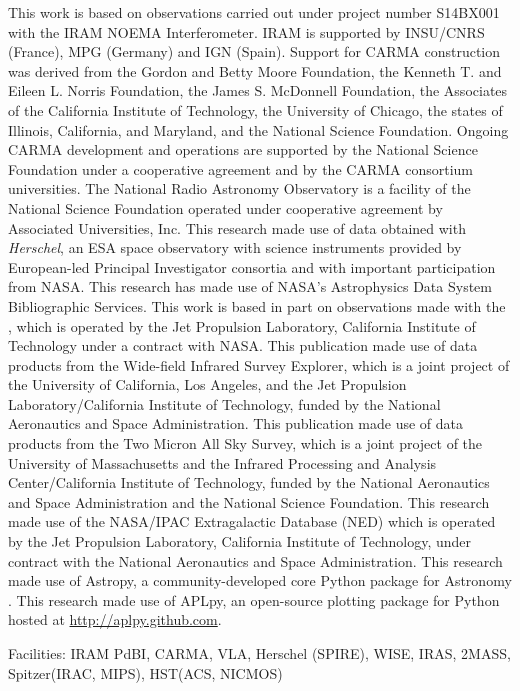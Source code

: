 \documentclass[]{emulateapj}
\begin{document}
\acknowledgments
This work is based on observations carried out under project number S14BX001
with the IRAM NOEMA Interferometer. IRAM is supported by INSU/CNRS (France), MPG (Germany) and IGN (Spain).
Support for CARMA construction was derived from the Gordon and Betty Moore
Foundation, the Kenneth T. and Eileen L. Norris Foundation, the James S.
McDonnell Foundation, the Associates of the California Institute of
Technology, the University of Chicago, the states of Illinois, California, and
Maryland, and the National Science Foundation. Ongoing CARMA development and
operations are supported by the National Science Foundation under a
cooperative agreement and by the CARMA consortium universities.
The National Radio Astronomy Observatory is a facility of the National Science
Foundation operated under cooperative agreement by Associated
Universities, Inc.
This research made use of data obtained with {\it Herschel}, an ESA space
observatory with science instruments provided by European-led Principal
Investigator consortia and with important participation from NASA.
This research has made use of NASA's Astrophysics Data System Bibliographic
Services.
This work is based in part on observations made with the \spitzer,
which is operated by the Jet Propulsion Laboratory, California Institute of
Technology under a contract with NASA.
This publication made use of data products from the Wide-field Infrared
Survey Explorer, which is a joint project of the University of California, Los
Angeles, and the Jet Propulsion Laboratory/California Institute of Technology,
funded by the National Aeronautics and Space Administration.
This publication made use of data products from the Two Micron All Sky
Survey, which is a joint project of the University of Massachusetts and the
Infrared Processing and Analysis Center/California Institute of Technology,
funded by the National Aeronautics and Space Administration and the National
Science Foundation.
This research made use of the NASA/IPAC Extragalactic Database (NED) which
is operated by the Jet Propulsion Laboratory, California Institute of
Technology, under contract with the National Aeronautics and Space
Administration.
This research made use of Astropy, a community-developed core Python package for Astronomy \citep{astropy}.
This research made use of APLpy, an open-source plotting package for Python hosted at \url{http://aplpy.github.com}.

Facilities: IRAM PdBI, CARMA, VLA, Herschel (SPIRE), WISE, IRAS, 2MASS, Spitzer(IRAC, MIPS), HST(ACS, NICMOS)




\end{document}
